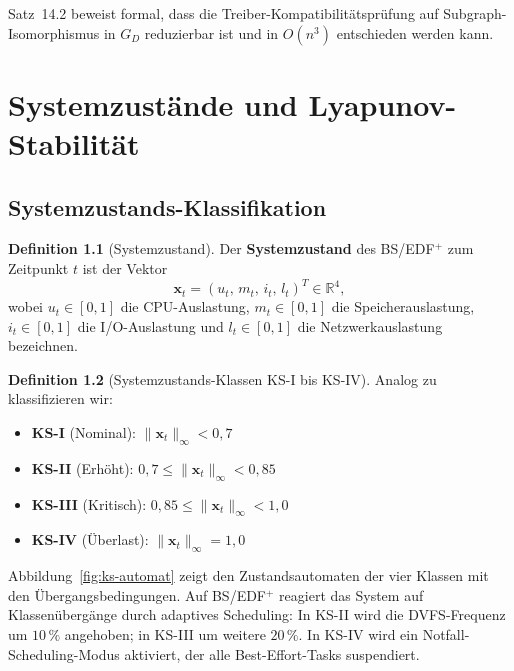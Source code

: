 ﻿\documentclass[a4paper,12pt]{scrreprt}
\theoremstyle{definition}
\newtheorem{definition}{Definition}[chapter]
\begin{document}
	Satz~14.2 beweist formal, dass die Treiber-Kompatibilitätsprüfung
	auf Subgraph-Isomor\-phismus in $G_D$ reduzierbar ist und in $O(n^3)$
	entschieden werden kann.
	
	\chapter{Systemzustände und Lyapunov-Stabilität}
	
	\section{Systemzustands-Klassifikation}

	\begin{definition}[Systemzustand]
		Der \textbf{Systemzustand} des BS/EDF$^+$ zum Zeitpunkt $t$ ist der
		Vektor
		\[
		\mathbf{x}_t = (u_t,\, m_t,\, i_t,\, l_t)^T \in \mathbb{R}^4,
		\]
		wobei $u_t \in [0,1]$ die CPU-Auslastung, $m_t \in [0,1]$ die
		Speicherauslastung, $i_t \in [0,1]$ die I/O-Auslastung und
		$l_t \in [0,1]$ die Netzwerkauslastung bezeichnen.
	\end{definition}

	\begin{definition}[Systemzustands-Klassen KS-I bis KS-IV]
		Analog zu \cite{Epp2026sysstate} klassifizieren wir:
		\begin{itemize}
			\item \textbf{KS-I} (Nominal): $\|\mathbf{x}_t\|_\infty < 0{,}7$
			\item \textbf{KS-II} (Erhöht): $0{,}7 \leq \|\mathbf{x}_t\|_\infty < 0{,}85$
			\item \textbf{KS-III} (Kritisch): $0{,}85 \leq \|\mathbf{x}_t\|_\infty < 1{,}0$
			\item \textbf{KS-IV} (Überlast): $\|\mathbf{x}_t\|_\infty = 1{,}0$
		\end{itemize}
	\end{definition}

	Abbildung~\ref{fig:ks-automat} zeigt den Zustandsautomaten der vier
	Klassen mit den Übergangsbedingungen. Auf BS/EDF$^+$ reagiert das
	System auf Klassenübergänge durch adaptives Scheduling: In KS-II wird
	die DVFS-Frequenz um $10\,\%$ angehoben; in KS-III um weitere $20\,\%$.
	In KS-IV wird ein Notfall-Scheduling-Modus aktiviert, der alle
	Best-Effort-Tasks suspendiert.
\end{document}
